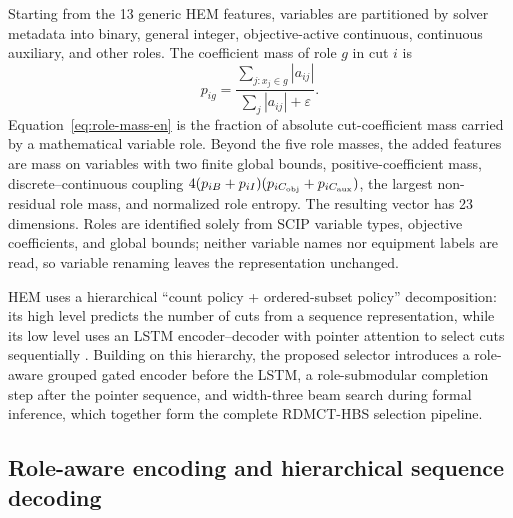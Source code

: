 \documentclass[final,5p,times,twocolumn]{elsarticle}
\begin{document}
Starting from the 13 generic HEM features, variables are partitioned by solver metadata into binary, general integer, objective-active continuous, continuous auxiliary, and other roles. The coefficient mass of role $g$ in cut $i$ is
\begin{equation}
p_{ig}=\frac{\sum_{j:x_j\in g}|a_{ij}|}{\sum_j|a_{ij}|+\varepsilon}.
\label{eq:role-mass-en}
\end{equation}
Equation~\eqref{eq:role-mass-en} is the fraction of absolute cut-coefficient mass carried by a mathematical variable role. Beyond the five role masses, the added features are mass on variables with two finite global bounds, positive-coefficient mass, discrete--continuous coupling $4(p_{iB}+p_{iI})(p_{iC_{\rm obj}}+p_{iC_{\rm aux}})$, the largest non-residual role mass, and normalized role entropy. The resulting vector has 23 dimensions. Roles are identified solely from SCIP variable types, objective coefficients, and global bounds; neither variable names nor equipment labels are read, so variable renaming leaves the representation unchanged.

HEM uses a hierarchical ``count policy + ordered-subset policy'' decomposition: its high level predicts the number of cuts from a sequence representation, while its low level uses an LSTM encoder--decoder with pointer attention to select cuts sequentially \citep{wang2023hem,vinyals2015pointer}. Building on this hierarchy, the proposed selector introduces a role-aware grouped gated encoder before the LSTM, a role-submodular completion step after the pointer sequence, and width-three beam search during formal inference, which together form the complete RDMCT-HBS selection pipeline.


\subsection{Role-aware encoding and hierarchical sequence decoding}
\end{document}
